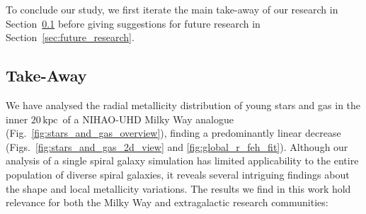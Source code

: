 \documentclass[twocolumn,apj,numberedappendix,appendixfloats,twocolappendix]{openjournal}
\newcommand{\nihaoRmax}{$20\,\mathrm{kpc}$}
\begin{document}
\begin{CJK*}{UTF8}{gbsn}
To conclude our study, we first iterate the main take-away of our research in Section~\ref{sec:take_away} before giving suggestions for future research in Section~\ref{sec:future_research}.

\newpage
\subsection{Take-Away} \label{sec:take_away}

We have analysed the radial metallicity distribution of young stars and gas in the inner \nihaoRmax\ of a NIHAO-UHD Milky Way analogue (Fig.~\ref{fig:stars_and_gas_overview}), finding a predominantly linear decrease (Figs.~\ref{fig:stars_and_gas_2d_view} and \ref{fig:global_r_feh_fit}). Although our analysis of a single spiral galaxy simulation has limited applicability to the entire population of diverse spiral galaxies, it reveals several intriguing findings about the shape and local metallicity variations. The results we find in this work hold relevance for both the Milky Way and extragalactic research communities:


\end{CJK*}
\end{document}
